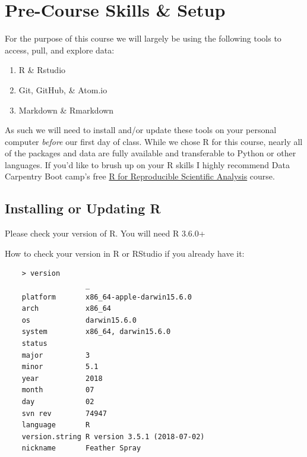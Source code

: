 \documentclass[
  letterpaper,
]{book}
\providecommand{\tightlist}{%
  \setlength{\itemsep}{0pt}\setlength{\parskip}{0pt}}
\begin{document}
\section*{Pre-Course Skills \& Setup}\label{pre-course-skills-setup}


For the purpose of this course we will largely be using the following
tools to access, pull, and explore data:

\begin{enumerate}
\def\labelenumi{\arabic{enumi}.}
\tightlist
\item
  R \& Rstudio
\item
  Git, GitHub, \& Atom.io
\item
  Markdown \& Rmarkdown
\end{enumerate}

As such we will need to install and/or update these tools on your
personal computer \emph{before} our first day of class. While we chose R
for this course, nearly all of the packages and data are fully available
and transferable to Python or other languages. If you'd like to brush up
on your R skills I highly recommend Data Carpentry Boot camp's free
\href{http://swcarpentry.github.io/r-novice-gapminder}{R for
Reproducible Scientific Analysis} course.

\subsection*{Installing or Updating R}\label{installing-or-updating-r}

Please check your version of R. You will need R 3.6.0+

How to check your version in R or RStudio if you already have it:

\begin{verbatim}
    > version
                   _                           
    platform       x86_64-apple-darwin15.6.0   
    arch           x86_64                      
    os             darwin15.6.0                
    system         x86_64, darwin15.6.0        
    status                                     
    major          3                           
    minor          5.1                         
    year           2018                        
    month          07                          
    day            02                          
    svn rev        74947                       
    language       R                           
    version.string R version 3.5.1 (2018-07-02)
    nickname       Feather Spray  
\end{verbatim}
\end{document}
